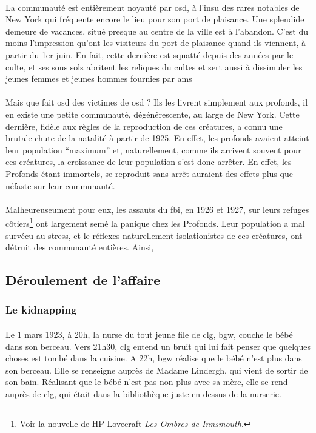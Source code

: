 \paragraph{} La communauté est entièrement noyauté par \gls{osd}, à l'insu des rares notables de New York qui
fréquente encore le lieu pour son port de plaisance. Une splendide demeure de vacances, situé presque au centre
de la ville est à l'abandon. C'est du moins l'impression qu'ont les visiteurs du port de plaisance quand ils
viennent, à partir du 1er juin. En fait, cette dernière est squatté depuis des années par le culte, et ses 
sous sols abritent les reliques du cultes et sert aussi à dissimuler les jeunes femmes et jeunes hommes 
fournies par \gls{ams}

\paragraph{} Mais que fait \gls{osd} des victimes de \gls{osd} ? Ils les livrent simplement aux profonds, il en 
existe une petite communauté, dégénérescente, au large de New York. Cette dernière, fidèle aux règles de la
reproduction de ces créatures, a connu une brutale chute de la natalité à partir de 1925. En effet, les 
profonds avaient atteint leur population ``maximum'' et, naturellement, comme ils arrivent souvent pour ces 
créatures, la croissance de leur population s'est donc arrêter. En effet, les Profonds étant immortels, se reproduit
sans arrêt auraient des effets plus que néfaste sur leur communauté.

\paragraph{} Malheureuseument pour eux, les assauts du \gls{fbi}, en 1926 et 1927, sur leurs refuges côtiers\footnote{
Voir la nouvelle de HP Lovecraft \emph{Les Ombres de Innsmouth}.} ont largement semé la panique chez les Profonds. Leur
population a mal survécu au stress, et le réflexes naturellement isolationistes de ces créatures, ont détruit des 
communauté entières. Ainsi, 

\subsection{Déroulement de l'affaire}
\subsubsection{Le kidnapping}
\paragraph{} Le 1 mars 1923, à 20h, la nurse du tout jeune file de \gls{clg}, \gls{bgw}, couche le bébé dans son berceau. Vers 
21h30, \gls{clg} entend un bruit qui lui fait penser que quelques choses est tombé dans la cuisine. A 22h, \gls{bgw} réalise que
le bébé n'est plus dans son berceau. Elle se renseigne auprès de Madame Lindergh, qui vient de sortir de son bain. Réalisant que
le bébé n'est pas non plus avec sa mère, elle se rend auprès de \gls{clg}, qui était dans la bibliothèque juste en dessus de la
nurserie. 
